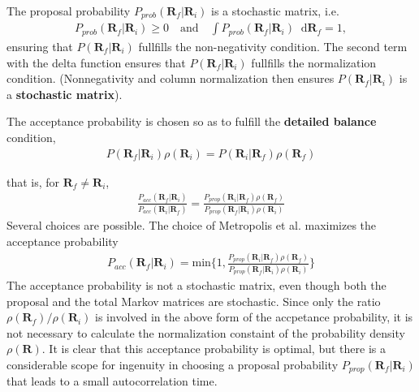 \documentclass[twoside,english]{uiofysmaster}
\newcommand*\dif{\mathop{}\!\mathrm{d}}
\begin{document}
The proposal probability $P_{prob}(\bm{R}_f |\bm{R}_i )$ is a stochastic matrix, i.e.
\begin{align}
	P_{prob}(\bm{R}_f |\bm{R}_i ) \geq 0 \quad \text{and} \quad
	\int P_{prob}(\bm{R}_f |\bm{R}_i ) \dif \bm{R}_f = 1,
\end{align}
ensuring that $P(\bm{R}_f| \bm{R}_i)$ fullfills the non-negativity condition. The second term with the delta function ensures that $P(\bm{R}_f| \bm{R}_i)$ fullfills the normalization condition. (Nonnegativity and column normalization then ensures $P(\bm{R}_f| \bm{R}_i)$ is a \textbf{stochastic matrix}).

The acceptance probability is chosen so as to fulfill the \textbf{detailed balance} condition,
\begin{align}
	P(\bm{R}_f| \bm{R}_i)  \rho (\bm{R}_i) = P(\bm{R}_i| \bm{R}_f) \rho (\bm{R}_f)
\end{align}

that is, for $\bm{R}_f \neq \bm{R}_i$,
\begin{align}
	\frac{ P_{acc} (\bm{R}_f| \bm{R}_i) }{ P_{acc} (\bm{R}_i| \bm{R}_f) }
	= \frac{ P_{prop} (\bm{R}_i| \bm{R}_f) \rho (\bm{R}_f) }
	{ P_{prop} (\bm{R}_f| \bm{R}_i) \rho (\bm{R}_i) }
\end{align}
Several choices are possible. The choice of Metropolis et al. \cite{Metropolis1953} maximizes the acceptance probability
\begin{align}
	P_{acc} (\bm{R}_f | \bm{R}_i) = \text{min} \{ 1, 
	\frac{ P_{prop} (\bm{R}_i| \bm{R}_f) \rho (\bm{R}_f) }
	{ P_{prop} (\bm{R}_f| \bm{R}_i) \rho (\bm{R}_i) } \}
\end{align}
The acceptance probability is not a stochastic matrix, even though both the proposal and the total Markov matrices are stochastic. Since only the ratio $\rho (\bm{R}_f)/\rho (\bm{R}_i)$ is involved in the above form of the accpetance probability, it is not necessary to calculate the normalization constaint of the probability density $\rho (\bm{R})$. It is clear that this acceptance probability is optimal, but there is a considerable scope for ingenuity in choosing a proposal probability $P_{prop} (\bm{R}_f| \bm{R}_i)$ that leads to a small autocorrelation time.

\cite{Toulouse2016}
\end{document}
